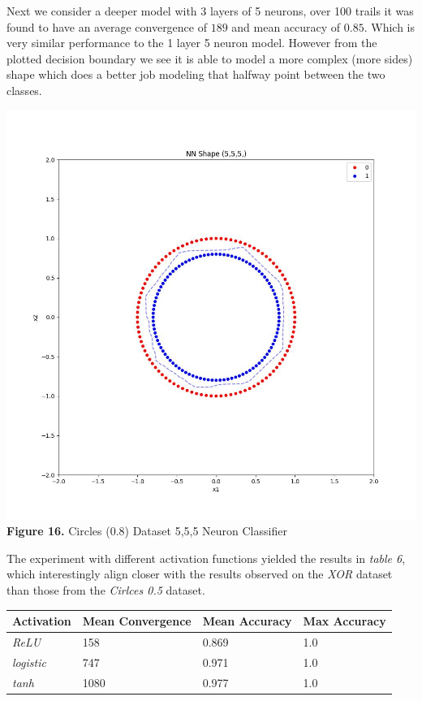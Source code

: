 \documentclass[11pt]{article}
\begin{document}
Next we consider a deeper model with 3 layers of 5 neurons, over 100
trails it was found to have an average convergence of \(189\) and mean
accuracy of \(0.85\). Which is very similar performance to the 1 layer 5
neuron model. However from the plotted decision boundary we see it is
able to model a more complex (more sides) shape which does a better job
modeling that halfway point between the two classes.

\includegraphics{figures/cir08_555_clf.jpg}\\
\textbf{Figure 16.} Circles (0.8) Dataset 5,5,5 Neuron Classifier

The experiment with different activation functions yielded the results
in \emph{table 6}, which interestingly align closer with the results
observed on the \emph{XOR} dataset than those from the \emph{Cirlces
0.5} dataset.

\begin{longtable}[]{@{}llll@{}}
\toprule
Activation & Mean Convergence & Mean Accuracy & Max Accuracy \\
\midrule
\endhead
\emph{ReLU} & 158 & 0.869 & 1.0 \\
\emph{logistic} & 747 & 0.971 & 1.0 \\
\emph{tanh} & 1080 & 0.977 & 1.0 \\
\bottomrule
\end{longtable}
\end{document}
